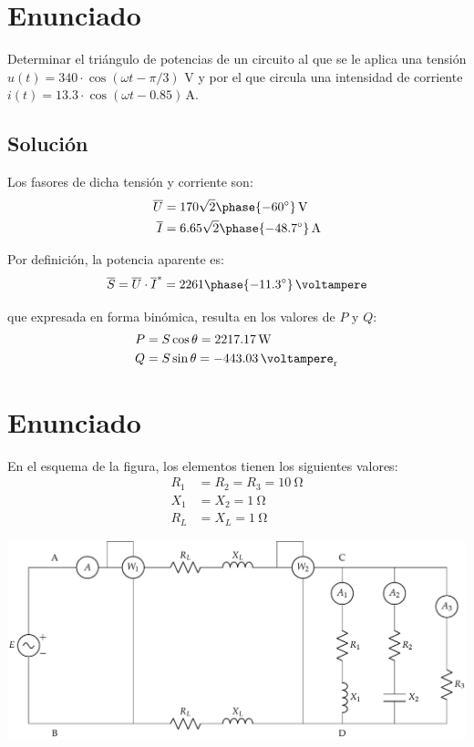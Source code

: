 
\section{Enunciado}

Determinar el triángulo de potencias de un circuito al que se le
aplica una tensión $u(t)=340 \cdot \cos(\omega t - \pi/3)$ V y
por el que circula una intensidad de corriente
$i(t)= 13.3 \cdot \cos(\omega t-0.85)\,\si{\ampere}$.

\subsection*{Solución}

Los fasores de dicha tensión y corriente son:
\begin{align*}
  \overline{U} &= 170 \sqrt{2}\phase{\ang{-60}}\,\si{\volt}\\
  \overline{I} &= 6.65\sqrt{2}\phase{\ang{-48.7}}\,\si{\ampere}
\end{align*}

Por definición, la potencia aparente es:
\begin{equation*}
  \overline{S} = \overline{U}\cdot\overline{I}^* = 2261\phase{\ang{-11.3}}\,\si{\voltampere}
\end{equation*}

que expresada en forma binómica, resulta en los valores de $P$ y $Q$:
\begin{align*}
  P &= S \cos \theta = \qty{2217.17}{\watt}\\
  Q &= S \sin \theta = \qty{-443.03}{\voltampere_r}
\end{align*}


\section{Enunciado}

En el esquema de la figura, los elementos tienen los siguientes valores:
\begin{align*}
  R_1 &= R_2 = R_3 = \qty{10}{\ohm}\\
  X_1 &= X_2 = \qty{1}{\ohm}\\
  R_L &= X_L = \qty{1}{\ohm}
\end{align*}

\begin{center}
  \includegraphics[width=0.85\linewidth]{figuras/BT2_08.pdf}
\end{center}

